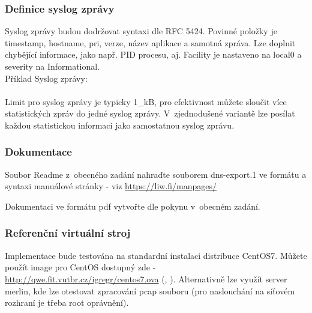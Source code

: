 \documentclass[11pt, a4paper, titlepage]{article}
\begin{document}
\subsubsection*{Definice syslog zprávy}

Syslog zprávy budou dodržovat syntaxi dle RFC 5424. Povinné položky je timestamp, hostname, pri, verze, název aplikace a samotná zpráva. Lze doplnit chybějící informace, jako např. PID procesu, aj. Facility je nastaveno na local0 a severity na Informational. \\

Příklad Syslog zprávy: \\
 \\

Limit pro syslog zprávy je typicky 1\_kB, pro efektivnost můžete sloučit více statistických zpráv do jedné syslog zprávy. V~zjednodušené variantě lze posílat každou statistickou informaci jako samostatnou syslog zprávu.


\subsubsection*{Dokumentace}

Soubor Readme z~obecného zadání nahraďte souborem dns-export.1 ve formátu a syntaxi manuálové stránky - viz \url{https://liw.fi/manpages/}

Dokumentaci ve formátu pdf vytvořte dle pokynu v~obecném zadání.


\subsubsection*{Referenční virtuální stroj}

Implementace bude testována na standardní instalaci distribuce CentOS7. Můžete použít image pro CentOS dostupný zde - \url{http://qwe.fit.vutbr.cz/igregr/centos7.ova} (, ). Alternativně lze využít server merlin, kde lze otestovat zpracování pcap souboru (pro naslouchání na síťovém rozhraní je třeba root oprávnění).

\end{document}
